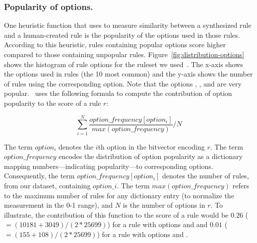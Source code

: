 \documentclass[sigconf,review, anonymous]{acmart}
\begin{document}

\subsubsection{\label{sec:popularity-options}Popularity of options.}
One heuristic function that \tname{} uses to measure similarity
between a synthesized rule and a human-created rule is the popularity
of the options used in those rules. According to this heuristic, rules
containing popular options score higher compared to those containing
unpopular rules. Figure~\ref{fig:distribution-options} shows the
histogram of rule options for the ruleset we
used~\cite{emerging-threats-open}. The x-axis shows the options used
in rules (the 10 most common) and the y-axis shows the number of rules
using the corresponding option. Note that the options
, , and  are very
popular. \tname\ uses the following formula to compute the
contribution of option popularity to the score of a rule $r$:

{\small
\vspace{-2ex}
\[\sum_{i=1}^{N}\frac{\mathit{option\_frequency[option_i]}}{\mathit{max(option\_frequency)}}/N\]
\vspace{-2ex}
}

\noindent
The term $\mathit{option_i}$ denotes the $i$th option in the bitvector
encoding $r$. The term $\mathit{option\_frequency}$ encodes the
distribution of option popularity as a dictionary mapping
numbers---indicating popularity---to corresponding
options. Consequently, the term $\mathit{option\_frequency[option_i]}$
denotes the number of rules, from our dataset, containing
$\mathit{option\_i}$. The term $\mathit{max(option\_frequency)}$
refers to the maximum number of rules for any dictionary entry (to
normalize the measurement in the 0-1 range), and $N$ is the number of
options in $r$. To illustrate, the contribution of this function to
the score of a rule would be $0.26$ ($=(10181+3049)/(2*25699)$) for a
rule with options  and  and $0.01$
($=(155+108)/(2*25699)$) for a rule with options  and
.

\end{document}

